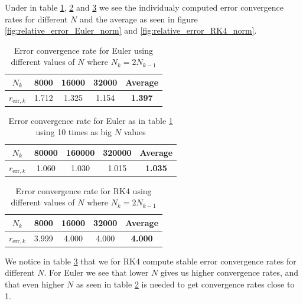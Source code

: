 \documentclass[english,notitlepage,reprint,nofootinbib]{revtex4-1}  %
\begin{document}
Under in table \ref{tab:convergence_euler}, \ref{tab:convergence_euler_x10} and \ref{tab:convergence_RK4} we see the individualy computed error convergence rates for different $N$ and the average as seen in figure \ref{fig:relative_error_Euler_norm} and \ref{fig:relative_error_RK4_norm}.
\begin{table}[H]
    \centering
    \caption{Error convergence rate for Euler using different values of $N$ where $N_k = 2N_{k-1}$}
    \label{tab:convergence_euler}
    \begin{tabular}{|c|c|c|c|c|}
        \hline
        $N_k$              & 8000  & 16000 & 32000 & \textbf{Average} \\
        \hline
        $r_{\text{err},k}$ & 1.712 & 1.325 & 1.154 & \textbf{1.397}   \\
        \hline
    \end{tabular}
\end{table}
\begin{table}[H]
    \centering
    \caption{Error convergence rate for Euler as in table \ref{tab:convergence_euler} using 10 times as big $N$ values}
    \label{tab:convergence_euler_x10}
    \begin{tabular}{|c|c|c|c|c|}
        \hline
        $N_k$              & 80000 & 160000 & 320000 & \textbf{Average} \\
        \hline
        $r_{\text{err},k}$ & 1.060 & 1.030  & 1.015  & \textbf{1.035}   \\
        \hline
    \end{tabular}
\end{table}
\begin{table}[H]
    \centering
    \caption{Error convergence rate for RK4 using different values of $N$ where $N_k = 2N_{k-1}$}
    \label{tab:convergence_RK4}
    \begin{tabular}{|c|c|c|c|c|}
        \hline
        $N_k$              & 8000  & 16000 & 32000 & \textbf{Average} \\
        \hline
        $r_{\text{err},k}$ & 3.999 & 4.000 & 4.000 & \textbf{4.000}   \\
        \hline
    \end{tabular}
\end{table}

We notice in table \ref{tab:convergence_RK4} that we for RK4 compute stable error convergence rates for different $N$. For Euler we see that lower $N$ gives us higher convergence rates, and that even higher $N$ as seen in table \ref{tab:convergence_euler_x10} is needed to get convergence rates close to 1.
\end{document}
